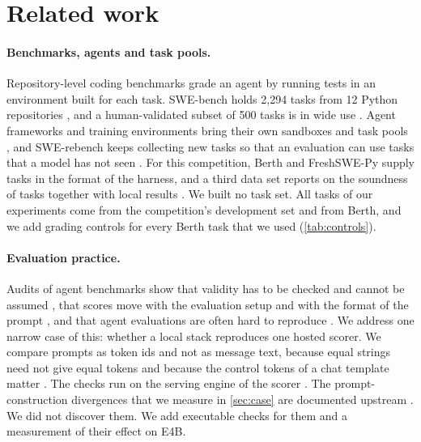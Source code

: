 \section{Related work}\label{sec:related}

\paragraph{Benchmarks, agents and task pools.}
Repository-level coding benchmarks grade an agent by running tests in an environment built for each task. SWE-bench
holds 2,294 tasks from 12 Python repositories \citep{jimenez2024swebench}, and a human-validated subset of 500 tasks is
in wide use \citep{openai2024swebenchverified}. Agent frameworks and training environments bring their own sandboxes
and task pools \citep{yang2024sweagent,wang2025openhands,pan2025swegym,yang2025swesmith}, and SWE-rebench keeps
collecting new tasks so that an evaluation can use tasks that a model has not seen
\citep{badertdinov2025swerebench}. For this competition, Berth \citep{patel2026berth} and FreshSWE-Py
\citep{moshegolderson2026freshswe} supply tasks in the format of the harness, and a third data set reports on the
soundness of tasks together with local results \citep{gluzdov2026soundness}. We built no task set. All tasks of our
experiments come from the competition's development set and from Berth, and we add grading controls for every Berth
task that we used (\cref{tab:controls}).

\paragraph{Evaluation practice.}
Audits of agent benchmarks show that validity has to be checked and cannot be assumed \citep{zhu2025abc}, that scores
move with the evaluation setup and with the format of the prompt \citep{biderman2024trenches,sclar2024formatting},
and that agent evaluations are often hard to reproduce \citep{kapoor2024agentsthatmatter}. We address one narrow case
of this: whether a local stack reproduces one hosted scorer. We compare prompts as token ids and not as message text,
because equal strings need not give equal tokens \citep{agl2025retokenization} and because the control tokens of a
chat template matter \citep{hf2026chattemplates}. The checks run on the serving engine of the scorer
\citep{kwon2023vllm}. The prompt-construction divergences that we measure in \cref{sec:case} are documented upstream
\citep{adk2026toolresponses,google2026gemma4prompt,dimondev2026hf44,gerganov2026hf135}. We did not discover them. We
add executable checks for them and a measurement of their effect on E4B.

